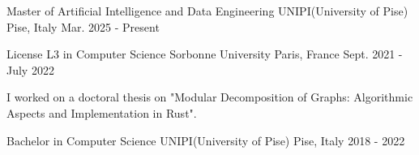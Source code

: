 

\begin{cventries}

  \cventry
  {Master of Artificial Intelligence and Data Engineering} %
  {UNIPI(University of Pise)} %
  {Pise, Italy} %
  {Mar. 2025 - Present} %
  {}


  \cventry
  {License L3 in Computer Science} %
  {Sorbonne University} %
  {Paris, France} %
  {Sept. 2021 - July 2022} %
  {
    \begin{cvitems} %
      \item {I worked on a doctoral thesis on "Modular Decomposition of Graphs: Algorithmic Aspects and Implementation in Rust".}
    \end{cvitems}
  }


  \cventry
  {Bachelor in Computer Science} %
  {UNIPI(University of Pise)} %
  {Pise, Italy} %
  {2018 - 2022} %
  {}


\end{cventries}
